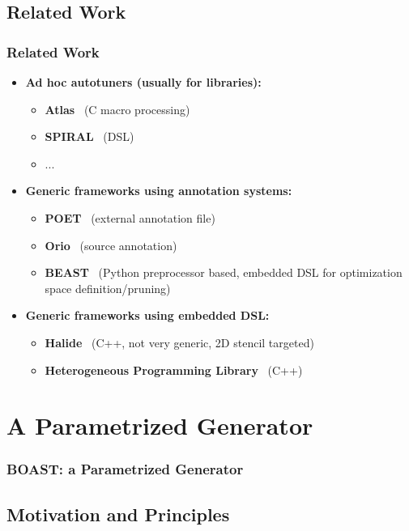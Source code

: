 \documentclass{beamer}
\begin{document}
\subsection{Related Work}

\begin{frame}
  \frametitle{Related Work}

  \begin{itemize}
    \item \textbf{Ad hoc autotuners (usually for libraries):}
    \begin{itemize}
      \item \textbf{Atlas}~\cite{whaley04} (C macro processing)
      \item \textbf{SPIRAL}~\cite{puschel2004spiral} (DSL)
      \item ...
    \end{itemize}
    \item \textbf{Generic frameworks using annotation systems:}
    \begin{itemize}
      \item \textbf{POET}~\cite{yi2007poet} (external annotation file)
      \item \textbf{Orio}~\cite{Hart2009:Orio} (source annotation)
      \item \textbf{BEAST}~\cite{CPE:CPE3516} (Python preprocessor based, embedded DSL for optimization space definition/pruning)
    \end{itemize}
    \item \textbf{Generic frameworks using embedded DSL:}
    \begin{itemize}
      \item \textbf{Halide}~\cite{ragan2013halide} (C++, not very generic, 2D stencil targeted)
      \item \textbf{Heterogeneous Programming Library}~\cite{F.Fabeiro:2016:WPM:2894387.2894576} (C++)
    \end{itemize}
  \end{itemize}

\end{frame}

\section{A Parametrized Generator}
\begin{frame}
\frametitle{BOAST: a Parametrized Generator}
\end{frame}

\subsection{Motivation and Principles}
\end{document}
